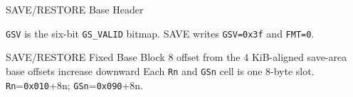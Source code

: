 \begin{manuallistedformatdiagram}{SAVE/RESTORE Base Header}
\end{manuallistedformatdiagram}
{\small\texttt{GSV} is the six-bit \texttt{GS\_VALID} bitmap. SAVE writes \texttt{GSV=0x3f} and \texttt{FMT=0}.\par}
\begin{manuallistedstructlayout}
  {SAVE/RESTORE Fixed Base Block}
  {8}
  {offset from the 4 KiB-aligned save-area base}
  {offsets increase downward}
\manualstructfooter
  {Each \texttt{Rn} and \texttt{GSn} cell is one 8-byte slot.}
  {\texttt{Rn}=\texttt{0x010}+8n; \texttt{GSn}=\texttt{0x090}+8n.}
\end{manuallistedstructlayout}
